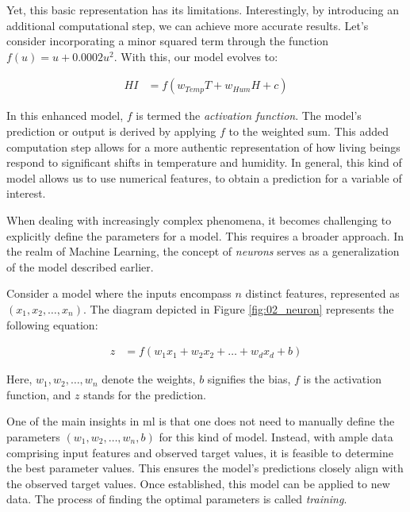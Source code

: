 Yet, this basic representation has its limitations. Interestingly, by introducing an additional computational step, we can achieve more accurate results. Let's consider incorporating a minor squared term through the function $f(u) = u + 0.0002 u^2$. With this, our model evolves to:

\begin{align*}
HI &= f(w_{Temp} T + w_{Hum} H + c)
\end{align*}

In this enhanced model, $f$ is termed the \emph{activation function}. The model's prediction or output is derived by applying $f$ to the weighted sum. This added computation step allows for a more authentic representation of how living beings respond to significant shifts in temperature and humidity. 
In general, this kind of model allows us to use numerical features, to obtain a prediction for a variable of interest.

\label{02_nn_neurons}




When dealing with increasingly complex phenomena, it becomes challenging to explicitly define the parameters for a model. This requires a broader approach. In the realm of Machine Learning, the concept of \emph{neurons} serves as a generalization of the model described earlier.



Consider a model where the inputs encompass $n$ distinct features, represented as $(x_1, x_2,\ldots,x_n)$. The diagram depicted in Figure \ref{fig:02_neuron} represents the following equation:

\begin{align*}
z &= f(w_1 x_1 + w_2 x_2 + \ldots + w_d x_d + b)
\end{align*}

Here, $w_1, w_2,\ldots,w_n$ denote the weights, $b$ signifies the bias, $f$ is the activation function, and $z$ stands for the prediction.

One of the main insights in \gls{ml} is that one does not need to manually define the parameters $(w_1, w_2,\ldots,w_n,b)$ for this kind of model.
Instead, with ample data comprising input features and observed target values, it is feasible to determine the best parameter values. This ensures the model's predictions closely align with the observed target values. Once established, this model can be applied to new data. The process of finding the optimal parameters is called \emph{training}.


